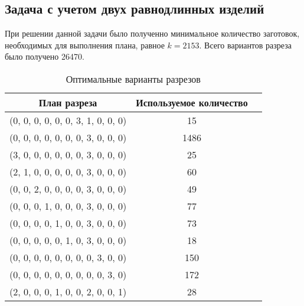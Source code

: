 \documentclass[../body.tex]{subfiles}
\begin{document}
\subsection{Задача с учетом двух равнодлинных изделий}
При решении данной задачи было полученно минимальное количество заготовок, необходимых для выполнения плана, равное $k=2153$. Всего вариантов разреза было получено 26470.
\begin{table}[H]
    \centering
    \begin{tabular}{|c|c|c|}
        \hline
        План разреза & Используемое количество\\\hline
        (0, 0, 0, 0, 0, 0, 3, 1, 0, 0, 0) & 15\\\hline
        (0, 0, 0, 0, 0, 0, 0, 3, 0, 0, 0) & 1486\\\hline
        (3, 0, 0, 0, 0, 0, 0, 3, 0, 0, 0) & 25\\\hline
        (2, 1, 0, 0, 0, 0, 0, 3, 0, 0, 0) & 60\\\hline
        (0, 0, 2, 0, 0, 0, 0, 3, 0, 0, 0) & 49\\\hline
        (0, 0, 0, 1, 0, 0, 0, 3, 0, 0, 0) & 77\\\hline
        (0, 0, 0, 0, 1, 0, 0, 3, 0, 0, 0) & 73\\\hline
        (0, 0, 0, 0, 0, 1, 0, 3, 0, 0, 0) & 18\\\hline
        (0, 0, 0, 0, 0, 0, 0, 0, 3, 0, 0) & 150\\\hline
        (0, 0, 0, 0, 0, 0, 0, 0, 0, 3, 0) & 172\\\hline
        (2, 0, 0, 0, 1, 0, 0, 2, 0, 0, 1) & 28\\\hline
    \end{tabular}
    \caption{Оптимальные варианты разрезов}
\end{table}
\end{document}
